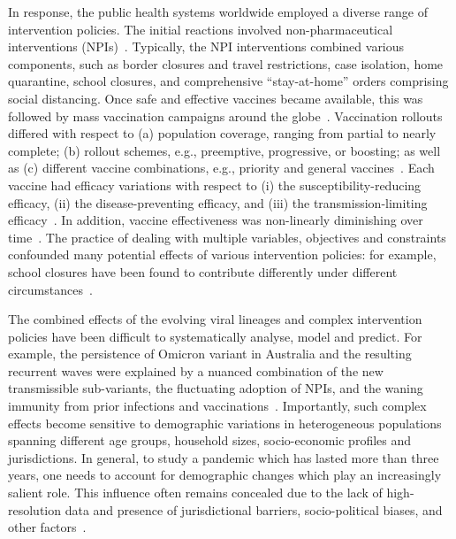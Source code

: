\documentclass{article}
\begin{document}
In response, the public health systems worldwide employed a diverse range of intervention policies. The initial reactions involved non-pharmaceutical interventions (NPIs)~\cite{walker2020impact,flaxman2020estimating,chang_modelling_2020}. Typically, the NPI interventions combined various components, such as border closures and travel restrictions, case isolation, home quarantine, school closures, and comprehensive ``stay-at-home'' orders comprising social distancing.  Once safe and effective vaccines became available, this was followed by mass vaccination campaigns around the globe~\cite{moore2021vaccination,harris2021impact,zachreson_how_2021}. Vaccination rollouts differed with respect to (a) population coverage, ranging from partial to nearly complete; (b) rollout schemes, e.g., preemptive, progressive, or boosting; as well as (c) different vaccine combinations, e.g., priority and general vaccines~\cite{zachreson_how_2021}. Each vaccine had efficacy variations with respect to (i) the susceptibility-reducing efficacy, (ii) the disease-preventing efficacy, and (iii) the transmission-limiting efficacy~\cite{moore2021vaccination,zachreson_how_2021}. In addition, vaccine effectiveness was non-linearly diminishing over time~\cite{szanyi2022log}. %
The practice of dealing with multiple variables, objectives and constraints confounded many potential effects of various intervention policies: for example, school closures have been found to  contribute differently under different circumstances~\cite{chang_modelling_2020,viner2020school}.  

The combined effects of the evolving viral lineages and complex intervention policies have been difficult to systematically analyse, model and predict. For example, the persistence of Omicron variant in Australia and the resulting recurrent waves were explained by a nuanced combination of the new transmissible sub-variants, the fluctuating adoption of NPIs, and the waning immunity from prior infections and vaccinations~\cite{chang_persistence_2023}. Importantly, such complex effects become sensitive to demographic variations in heterogeneous populations spanning different age groups, household sizes, socio-economic profiles and jurisdictions. In general, to study a pandemic which has lasted more than three years, one needs to account for demographic changes which play an increasingly salient role. This influence often remains concealed due to the lack of high-resolution data and presence of jurisdictional barriers, socio-political biases,  and other factors~\cite{kontis2020magnitude,volk2021influence}. 
\end{document}
